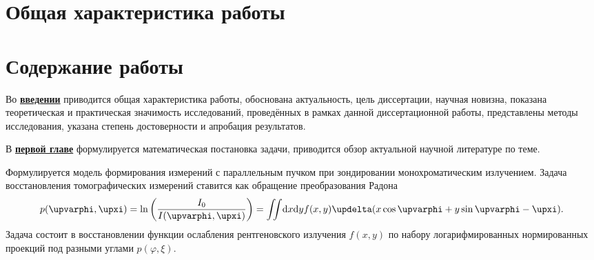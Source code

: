 \section*{Общая характеристика работы}

\newcommand{\actuality}{\underline{\textbf{\actualityTXT}}}
\newcommand{\progress}{\underline{\textbf{\progressTXT}}}
\newcommand{\actualityandprogress}{\underline{\textbf{\actualityandprogressTXT}}}
\newcommand{\aim}{\underline{{\textbf\aimTXT}}}
\newcommand{\tasks}{\underline{\textbf{\tasksTXT}}}
\newcommand{\novelty}{\underline{\textbf{\noveltyTXT}}}
\newcommand{\influence}{\underline{\textbf{\influenceTXT}}}
\newcommand{\methods}{\underline{\textbf{\methodsTXT}}}
\newcommand{\defpositions}{\underline{\textbf{\defpositionsTXT}}}
\newcommand{\reliability}{\underline{\textbf{\reliabilityTXT}}}
\newcommand{\probation}{\underline{\textbf{\probationTXT}}}
\newcommand{\contribution}{\underline{\textbf{\contributionTXT}}}
\newcommand{\publications}{\underline{\textbf{\publicationsTXT}}}




\section*{Содержание работы}
Во \underline{\textbf{введении}} приводится общая характеристика работы, 
обоснована актуальность, цель диссертации, научная новизна, показана теоретическая и практическая значимость исследований,
проведённых в рамках данной диссертационной работы, представлены методы исследования, указана степень достоверности и апробация результатов.

В \underline{\textbf{первой главе}} формулируется математическая постановка задачи, приводится обзор актуальной научной литературе по теме.

Формулируется модель формирования измерений с параллельным пучком при зондировании монохроматическим излучением. 
Задача восстановления томографических измерений ставится как обращение преобразования Радона 
\begin{equation}\notag
  p(\varphi, \xi) = \ln \left (\frac{I_0}{I(\varphi, \xi)} \right) = 
 \iint \! \mathrm d x \mathrm d y f(x,y)\delta(x\cos\varphi + y\sin\varphi - \xi).
\end{equation}
Задача состоит в восстановлении функции ослабления рентгеновского излучения $f(x,y)$ по набору логарифмированных нормированных проекций под разными углами $p(\varphi, \xi)$.

